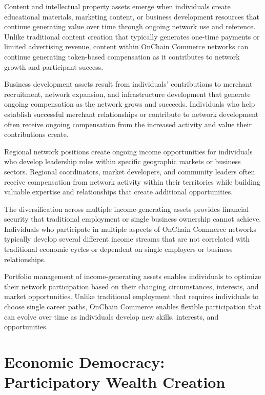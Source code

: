 \documentclass[
  Letterpaper,
]{scrbook}
\begin{document}
Content and intellectual property assets emerge when individuals create
educational materials, marketing content, or business development
resources that continue generating value over time through ongoing
network use and reference. Unlike traditional content creation that
typically generates one-time payments or limited advertising revenue,
content within OnChain Commerce networks can continue generating
token-based compensation as it contributes to network growth and
participant success.

Business development assets result from individuals' contributions to
merchant recruitment, network expansion, and infrastructure development
that generate ongoing compensation as the network grows and succeeds.
Individuals who help establish successful merchant relationships or
contribute to network development often receive ongoing compensation
from the increased activity and value their contributions create.

Regional network positions create ongoing income opportunities for
individuals who develop leadership roles within specific geographic
markets or business sectors. Regional coordinators, market developers,
and community leaders often receive compensation from network activity
within their territories while building valuable expertise and
relationships that create additional opportunities.

The diversification across multiple income-generating assets provides
financial security that traditional employment or single business
ownership cannot achieve. Individuals who participate in multiple
aspects of OnChain Commerce networks typically develop several different
income streams that are not correlated with traditional economic cycles
or dependent on single employers or business relationships.

Portfolio management of income-generating assets enables individuals to
optimize their network participation based on their changing
circumstances, interests, and market opportunities. Unlike traditional
employment that requires individuals to choose single career paths,
OnChain Commerce enables flexible participation that can evolve over
time as individuals develop new skills, interests, and opportunities.

\section{Economic Democracy: Participatory Wealth
Creation}\label{economic-democracy-participatory-wealth-creation}
\end{document}
